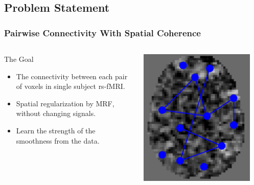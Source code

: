 \documentclass[sansserif, 10pt]{beamer}
\begin{document}
\subsection{Problem Statement}
\begin{frame}
  \frametitle{Pairwise Connectivity With Spatial Coherence~\cite{liu2010spatialCopy}}
  \begin{columns}
    \begin{column}{0.5\textwidth}
      \begin{block}{The Goal}
        \begin{itemize}
        \item The connectivity between each pair of voxels in single subject
          rs-fMRI.
        \item Spatial regularization by MRF, without changing signals. 
        \item Learn the strength of the smoothness from the data.
        \end{itemize}
      \end{block}
      \end{column}
    \begin{column}{0.5\textwidth}
      \includegraphics[width=0.9\textwidth]{sfig/pairwise_conn}
    \end{column}
  \end{columns}
\end{frame}
\end{document}
